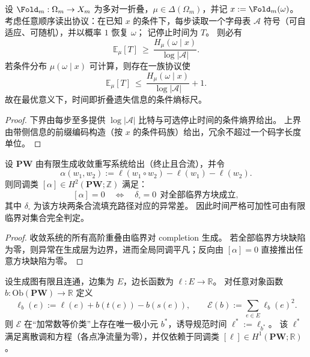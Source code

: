 \begin{theorem}\label{thm:xi-optimal-recovery-time-equals-conditional-entropy}
设 \(\Fold_m:\Omega_m\to X_m\) 为多对一折叠，\(\mu\in\Delta(\Omega_m)\)，并记
\(
x:=\Fold_m(\omega)
\)。
考虑任意顺序读出协议：在已知 \(x\) 的条件下，每步读取一个字母表 \(\mathcal A\) 符号（可自适应、可随机），并以概率 \(1\) 恢复 \(\omega\)；
记停止时间为 \(T\)。
则必有
\[
\mathbb E_\mu[T]\ \ge\ \frac{H_\mu(\omega\mid x)}{\log|\mathcal A|}.
\]
若条件分布 \(\mu(\omega\mid x)\) 可计算，则存在一族协议使
\[
\mathbb E_\mu[T]\ \le\ \frac{H_\mu(\omega\mid x)}{\log|\mathcal A|}+1.
\]
故在最优意义下，时间即折叠遗失信息的条件熵标尺。
\end{theorem}

\begin{proof}
下界由每步至多提供 \(\log|\mathcal A|\) 比特与可选停止时间的条件熵界给出。
上界由带侧信息的前缀编码构造（按 \(x\) 的条件码族）给出，冗余不超过一个码字长度单位。
\end{proof}

\begin{theorem}\label{thm:xi-time-additivity-finite-critical-square-criterion}
设 \(\mathbf{PW}\) 由有限生成收敛重写系统给出（终止且合流），并令
\[
\alpha(w_1,w_2):=\ell(w_1\circ w_2)-\ell(w_1)-\ell(w_2).
\]
则同调类 \([\alpha]\in H^2(\mathbf{PW};\mathbb Z)\) 满足：
\[
[\alpha]=0
\quad\Longleftrightarrow\quad
\delta_{\square}=0\ \ \text{对全部临界方块成立},
\]
其中 \(\delta_{\square}\) 为该方块两条合流填充路径对应的异常差。
因此时间严格可加性可由有限临界对集合完全判定。
\end{theorem}

\begin{proof}
收敛系统的所有高阶重叠由临界对 completion 生成。
若全部临界方块缺陷为零，则异常在生成层为边界，进而全局同调平凡；反向由 \([\alpha]=0\) 直接推出任意方块缺陷为零。
\end{proof}

\begin{theorem}\label{thm:xi-canonical-time-gauge-harmonic-representative}
设生成图有限且连通，边集为 \(E\)，边长函数为 \(\ell:E\to\mathbb R\)。
对任意对象函数 \(b:\mathrm{Ob}(\mathbf{PW})\to\mathbb R\) 定义
\[
\ell_b(e):=\ell(e)+b(t(e))-b(s(e)),
\qquad
\mathcal E(b):=\sum_{e\in E}\ell_b(e)^2.
\]
则 \(\mathcal E\) 在“加常数等价类”上存在唯一极小元 \(b^\ast\)，诱导规范时间
\(
\ell^\ast:=\ell_{b^\ast}
\)。
该 \(\ell^\ast\) 满足离散调和方程（各点净流量为零），并仅依赖于同调类 \([\ell]\in H^1(\mathbf{PW};\mathbb R)\)。
\end{theorem}

